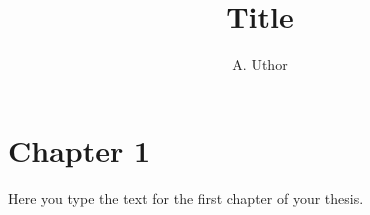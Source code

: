 \documentclass[twoside,single]{lion-msc}
\title{Title}
\author{A. Uthor}
\begin{document}
\maketitle

\chapter{Chapter 1}

Here you type the text for the first chapter of your thesis.
\end{document}
